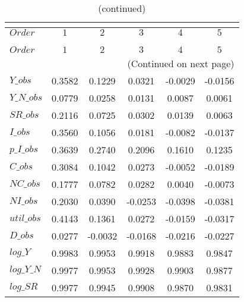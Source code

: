  
\begin{center}
\begin{longtable}{lccccc} 
\caption{COEFFICIENTS OF AUTOCORRELATION}\\
 \label{Table:th_autocorr_matrix}\\
\toprule 
$Order      $	 & 	 $         1$	 & 	 $         2$	 & 	 $         3$	 & 	 $         4$	 & 	 $         5$\\
\midrule \endfirsthead 
\caption{(continued)}\\
 \toprule \\ 
$Order      $	 & 	 $         1$	 & 	 $         2$	 & 	 $         3$	 & 	 $         4$	 & 	 $         5$\\
\midrule \endhead 
\midrule \multicolumn{6}{r}{(Continued on next page)} \\ \bottomrule \endfoot 
\bottomrule \endlastfoot 
$Y\_obs     $	 & 	    0.3582	 & 	    0.1229	 & 	    0.0321	 & 	   -0.0029	 & 	   -0.0156 \\ 
$Y\_N\_obs  $	 & 	    0.0779	 & 	    0.0258	 & 	    0.0131	 & 	    0.0087	 & 	    0.0061 \\ 
$SR\_obs    $	 & 	    0.2116	 & 	    0.0725	 & 	    0.0302	 & 	    0.0139	 & 	    0.0063 \\ 
$I\_obs     $	 & 	    0.3560	 & 	    0.1056	 & 	    0.0181	 & 	   -0.0082	 & 	   -0.0137 \\ 
$p\_I\_obs  $	 & 	    0.3639	 & 	    0.2740	 & 	    0.2096	 & 	    0.1610	 & 	    0.1235 \\ 
$C\_obs     $	 & 	    0.3084	 & 	    0.1042	 & 	    0.0273	 & 	   -0.0052	 & 	   -0.0189 \\ 
$NC\_obs    $	 & 	    0.1777	 & 	    0.0782	 & 	    0.0282	 & 	    0.0040	 & 	   -0.0073 \\ 
$NI\_obs    $	 & 	    0.2030	 & 	    0.0390	 & 	   -0.0253	 & 	   -0.0398	 & 	   -0.0381 \\ 
$util\_obs  $	 & 	    0.4143	 & 	    0.1361	 & 	    0.0272	 & 	   -0.0159	 & 	   -0.0317 \\ 
$D\_obs     $	 & 	    0.0277	 & 	   -0.0032	 & 	   -0.0168	 & 	   -0.0216	 & 	   -0.0227 \\ 
$log\_Y     $	 & 	    0.9983	 & 	    0.9953	 & 	    0.9918	 & 	    0.9883	 & 	    0.9847 \\ 
$log\_Y\_N  $	 & 	    0.9977	 & 	    0.9953	 & 	    0.9928	 & 	    0.9903	 & 	    0.9877 \\ 
$log\_SR    $	 & 	    0.9977	 & 	    0.9945	 & 	    0.9908	 & 	    0.9870	 & 	    0.9831 \\ 

\end{longtable}
\end{center}
